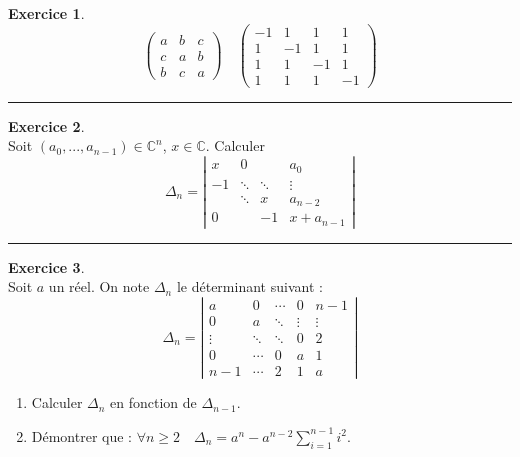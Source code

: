 \documentclass[a4paper,10pt]{article}
\theoremstyle{definition}
\theoremstyle{definition}
\newtheorem{exo}{Exercice}
\newcommand{\C}{\mathbb{C}}
\begin{document}
\begin{minipage}{1\linewidth}
\begin{minipage}[t]{0.48\linewidth}
\begin{exo}
			$$
			\begin{pmatrix}
			a&b&c\\c&a&b\\b&c&a
			\end{pmatrix}
			\quad
			\begin{pmatrix}
			-1 & 1 & 1 & 1\\ 1 & -1 & 1 & 1\\ 1 & 1 & -1& 1\\ 1 & 1& 1&-1
			\end{pmatrix}
			$$
			\centering
			\rule{1\linewidth}{0.6pt}
		\end{exo}
	
		\begin{exo}\quad\\[0.25cm]
		Soit $(a_{0},...,a_{n-1})\in\C^{n}$, $x\in\C$. Calculer
		$$
		\Delta_{n}=
		\left|
		\begin{matrix}
		x &  0    &        & a_{0}   \\
		-1 &\ddots &\ddots  &\vdots  \\
		&\ddots &x      & a_{n-2} \\
		0 &       & -1      & x+a_{n-1}
		\end{matrix}
		\right|
		$$
		\centering
		\rule{1\linewidth}{0.6pt}
	\end{exo}
		
		
		
	\end{minipage}	
	\hfill\vrule\hfill
	\begin{minipage}[t]{0.48\linewidth}
		\raggedright
		
		\begin{exo}\quad\\
			Soit $a$ un réel.
			On note $\Delta_n$ le déterminant suivant : 
			$$
			\Delta_n = 
			\left\vert
			\begin{matrix}
			a   &    0   & \cdots & 0      & n-1 \\
			0   &    a   & \ddots & \vdots & \vdots \\
			\vdots & \ddots & \ddots & 0      & 2 \\
			0   & \cdots &   0    & a      & 1 \\
			n-1  & \cdots &   2    & 1      & a
			\end{matrix}
			\right\vert
			$$
			\begin{enumerate}
				\item Calculer $\Delta_n$ en fonction de $\Delta_{n-1}$.
				\item Démontrer que : $\displaystyle \forall n\geq2\quad
				\Delta_n=a^n-a^{n-2}\sum_{i=1}^{n-1}{i^2}$.
			\end{enumerate}
			

\end{exo}
\end{minipage}
\end{minipage}
\end{document}
